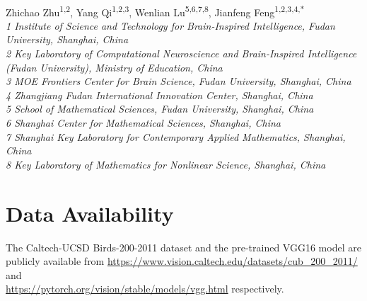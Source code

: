 \documentclass[11pt, letterpaper]{article}
\begin{document}
\vspace*{0.35in}

\begin{flushleft}
{\Large
\textbf{}
}
\newline
\\
Zhichao Zhu\textsuperscript{1,2}, 
Yang Qi\textsuperscript{1,2,3}, 
Wenlian Lu\textsuperscript{5,6,7,8},
Jianfeng Feng\textsuperscript{1,2,3,4,*}
\\
\bigskip
\it{1} Institute of Science and Technology for Brain-Inspired Intelligence, Fudan University, Shanghai, China
\\
\it{2} Key Laboratory of Computational Neuroscience and Brain-Inspired Intelligence (Fudan University), Ministry of Education, China
\\
\it{3} MOE Frontiers Center for Brain Science, Fudan University, Shanghai, China
\\
\it{4} Zhangjiang Fudan International Innovation Center, Shanghai, China
\\
\it{5} School of Mathematical Sciences, Fudan University, Shanghai, China
\\
\it{6} Shanghai Center for Mathematical Sciences, Shanghai, China
\\
\it{7} Shanghai Key Laboratory for Contemporary Applied Mathematics, Shanghai, China
\\
\it{8} Key Laboratory of Mathematics for Nonlinear Science, Shanghai, China
\bigskip

\end{flushleft}

%
%

\section*{Data Availability}
The Caltech-UCSD Birds-200-2011 dataset and the pre-trained VGG16 model are publicly available from \href{https://www.vision.caltech.edu/datasets/cub_200_2011/}{https://www.vision.caltech.edu/datasets/cub\_200\_2011/} and \\ \href{https://pytorch.org/vision/stable/models/vgg.html}{https://pytorch.org/vision/stable/models/vgg.html} respectively.
\end{document}
